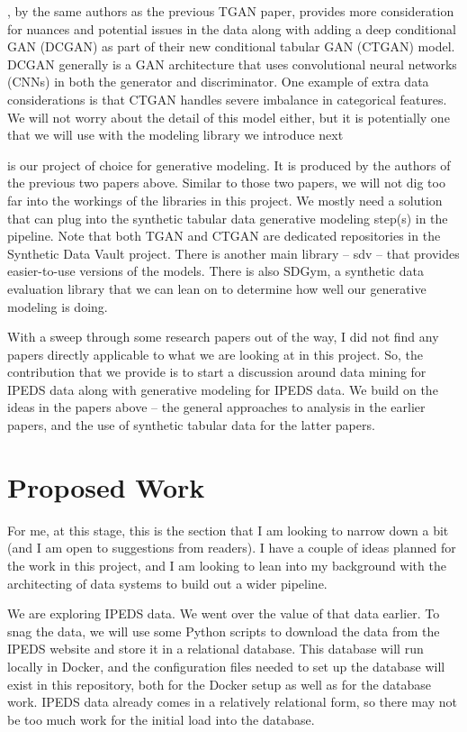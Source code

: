 \documentclass[sigconf, authorversion, nonacm]{acmart}
\begin{document}
    \cite{DBLP:journals/corr/abs-1907-00503}, by the same authors as the previous TGAN paper, provides more consideration for nuances and potential issues in the data along with adding a deep conditional GAN (DCGAN) as part of their new conditional tabular GAN (CTGAN) model. DCGAN generally is a GAN architecture that uses convolutional neural networks (CNNs) in both the generator and discriminator. One example of extra data considerations is that CTGAN handles severe imbalance in categorical features. We will not worry about the detail of this model either, but it is potentially one that we will use with the modeling library we introduce next

    \cite{sdv} is our project of choice for generative modeling. It is produced by the authors of the previous two papers above. Similar to those two papers, we will not dig too far into the workings of the libraries in this project. We mostly need a solution that can plug into the synthetic tabular data generative modeling step(s) in the pipeline. Note that both TGAN and CTGAN are dedicated repositories in the Synthetic Data Vault project. There is another main library -- sdv -- that provides easier-to-use versions of the models. There is also SDGym, a synthetic data evaluation library that we can lean on to determine how well our generative modeling is doing.

    With a sweep through some research papers out of the way, I did not find any papers directly applicable to what we are looking at in this project. So, the contribution that we provide is to start a discussion around data mining for IPEDS data along with generative modeling for IPEDS data. We build on the ideas in the papers above -- the general approaches to analysis in the earlier papers, and the use of synthetic tabular data for the latter papers.

\section{Proposed Work}

    For me, at this stage, this is the section that I am looking to narrow down a bit (and I am open to suggestions from readers). I have a couple of ideas planned for the work in this project, and I am looking to lean into my background with the architecting of data systems to build out a wider pipeline.

    We are exploring IPEDS data. We went over the value of that data earlier. To snag the data, we will use some Python scripts to download the data from the IPEDS website and store it in a relational database. This database will run locally in Docker, and the configuration files needed to set up the database will exist in this repository, both for the Docker setup as well as for the database work. IPEDS data already comes in a relatively relational form, so there may not be too much work for the initial load into the database.
\end{document}
